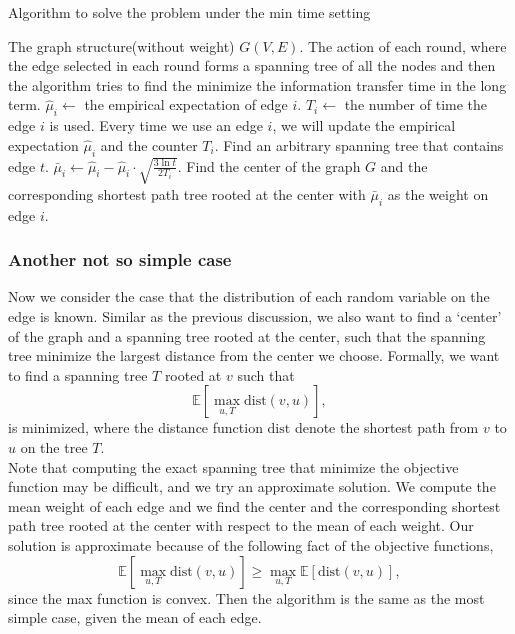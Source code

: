 \documentclass{article}
\theoremstyle{plain}
\theoremstyle{definition}
\theoremstyle{remark}
\begin{document}
    \begin{algorithm}
        \caption{Algorithm to solve the problem under the min time setting}
        \label{cucbcentertree}
        \begin{algorithmic}[1]
        \Require The graph structure(without weight) $G(V,E)$.
        \Ensure The action of each round, where the edge selected in each round forms a spanning tree of all the nodes and then the algorithm tries to find the minimize the information transfer time in the long term.
            \State $\hat \mu_i \leftarrow$ the empirical expectation of edge $i$.
            \State $T_i \leftarrow$ the number of time the edge $i$ is used.
            \State Every time we use an edge $i$, we will update the empirical expectation $\hat \mu_i$ and the counter $T_i$.
                \State Find an arbitrary spanning tree that contains edge $t$.
            \EndFor
                \State $\bar\mu_i \leftarrow \hat\mu_i - \hat\mu_i\cdot\sqrt{\frac{3\ln t}{2T_i}}$.
                \State Find the center of the graph $G$ and the corresponding shortest path tree rooted at the center with $\bar\mu_i$ as the weight on edge $i$.
            \EndFor
        \EndProcedure
        \end{algorithmic}
    \end{algorithm}


    \subsubsection{Another not so simple case}
    Now we consider the case that the distribution of each random variable on the edge is known. Similar as the previous discussion, we also want to find a `center' of the graph and a spanning tree rooted at the center, such that the spanning tree minimize the largest distance from the center we choose. Formally, we want to find a spanning tree $T$ rooted at $v$ such that
    \[\mathbb E[\max_{u,T}\text{dist}(v,u)],\]
    is minimized, where the distance function $\text{dist}$ denote the shortest path from $v$ to $u$ on the tree $T$.\\

    Note that computing the exact spanning tree that minimize the objective function may be difficult, and we try an approximate solution. We compute the mean weight of each edge and we find the center and the corresponding shortest path tree rooted at the center with respect to the mean of each weight. Our solution is approximate because of the following fact of the objective functions,
    \[\mathbb E[\max_{u,T}\text{dist}(v,u)] \ge \max_{u,T}\mathbb E[\text{dist}(v,u)],\]
    since the max function is convex. Then the algorithm is the same as the most simple case, given the mean of each edge.
\end{document}
